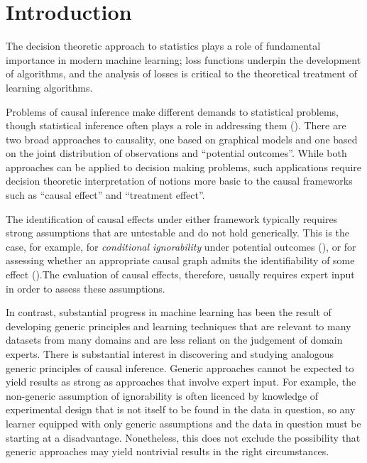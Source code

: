 \section{Introduction}



The decision theoretic approach to statistics plays a role of fundamental importance in modern machine learning; loss functions underpin the development of algorithms, and the analysis of losses is critical to the theoretical treatment of learning algorithms.

Problems of causal inference make different demands to statistical problems, though statistical inference often plays a role in addressing them (\cite{pearl_causality:_2009}). There are two broad approaches to causality, one based on graphical models and one based on the joint distribution of observations and ``potential outcomes''. While both approaches can be applied to decision making problems, such applications require decision theoretic interpretation of notions more basic to the causal frameworks such as ``causal effect'' and ``treatment effect''.

The identification of causal effects under either framework typically requires strong assumptions that are untestable and do not hold generically. This is the case, for example, for \emph{conditional ignorability} under potential outcomes (\cite{gordon_comparison_2018, heckman_randomization_1991}), or for assessing whether an appropriate causal graph admits the identifiability of some effect (\cite{tian2002general}).The evaluation of causal effects, therefore, usually requires expert input in order to assess these assumptions.

In contrast, substantial progress in machine learning has been the result of developing generic principles and learning techniques that are relevant to many datasets from many domains and are less reliant on the judgement of domain experts. There is substantial interest in discovering and studying analogous generic principles of causal inference. Generic approaches cannot be expected to yield results as strong as approaches that involve expert input. For example, the non-generic assumption of ignorability is often licenced by knowledge of experimental design that is not itself to be found in the data in question, so any learner equipped with only generic assumptions and the data in question must be starting at a disadvantage. Nonetheless, this does not exclude the possibility that generic approaches may yield nontrivial results in the right circumstances.


